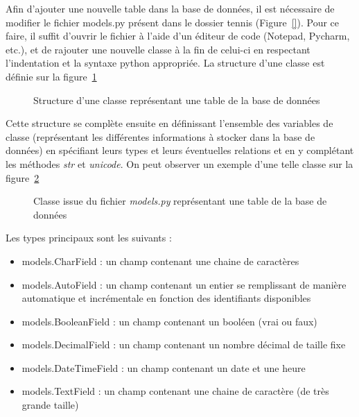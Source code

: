 Afin d'ajouter une nouvelle table dans la base de données, il est nécessaire de modifier le fichier models.py présent dans le dossier tennis (Figure~\ref{}). Pour ce faire, il suffit d'ouvrir le fichier à l'aide d'un éditeur de code (Notepad, Pycharm, etc.), et de rajouter une nouvelle classe à la fin de celui-ci en respectant l'indentation et la syntaxe python appropriée. La structure d'une classe est définie sur la figure~\ref{fig:Structure d'une classe représentant une table de la base de données}

\begin{figure}[!ht]
\centering
\begin{framed}

\end{framed}
\caption{Structure d'une classe représentant une table de la base de données}
\label{fig:Structure d'une classe représentant une table de la base de données}
\end{figure}
\FloatBarrier

Cette structure se complète ensuite en définissant l'ensemble des variables de classe (représentant les différentes informations à stocker dans la base de données) en spécifiant leurs types et leurs éventuelles relations et en y complétant les méthodes \textit{str} et \textit{unicode}. On peut observer un exemple d'une telle classe sur la figure~\ref{fig:Classe issue du fichier models.py représentant une table de la base de données}

\begin{figure}[!ht]
\centering
\begin{framed}

\end{framed}
\caption{Classe issue du fichier \textit{models.py} représentant une table de la base de données}
\label{fig:Classe issue du fichier models.py représentant une table de la base de données}
\end{figure}
\FloatBarrier

Les types principaux sont les suivants :\\

\begin{itemize}
\item models.CharField : un champ contenant une chaine de caractères
\item models.AutoField : un champ contenant un entier se remplissant de manière automatique et incrémentale en fonction des identifiants disponibles
\item models.BooleanField : un champ contenant un booléen (vrai ou faux)
\item models.DecimalField : un champ contenant un nombre décimal de taille fixe
\item models.DateTimeField : un champ contenant un date et une heure
\item models.TextField : un champ contenant une chaine de caractère (de très grande taille)\\
\end{itemize}

